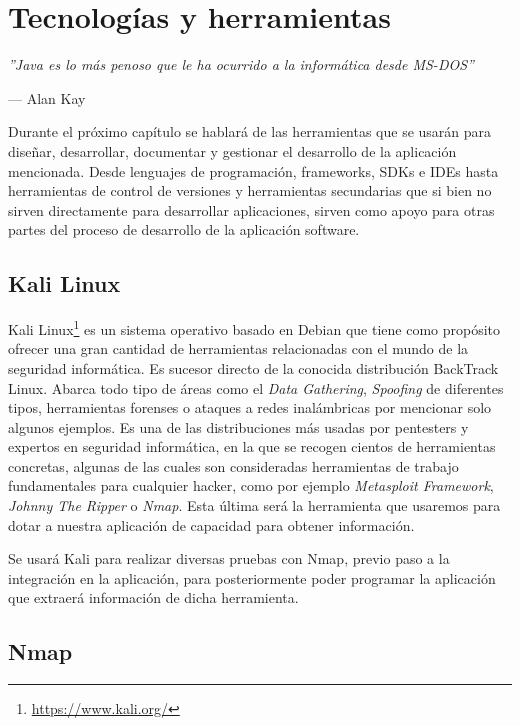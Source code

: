\chapter{Tecnologías y herramientas}

\epigraph{\textit{''Java es lo más penoso que le ha ocurrido a la informática desde MS-DOS''}}{--- Alan Kay}

Durante el próximo capítulo se hablará de las herramientas que se usarán para diseñar, desarrollar, documentar y gestionar el desarrollo de la aplicación mencionada. Desde lenguajes de programación, frameworks, SDKs e IDEs hasta herramientas de control de versiones y herramientas secundarias que si bien no sirven directamente para desarrollar aplicaciones, sirven como apoyo para otras partes del proceso de desarrollo de la aplicación software.

\section{Kali Linux}

Kali Linux\footnote{\url{https://www.kali.org/}} es un sistema operativo basado en Debian que tiene como propósito ofrecer una gran cantidad de herramientas relacionadas con el mundo de la seguridad informática. Es sucesor directo de la conocida distribución BackTrack Linux. Abarca todo tipo de áreas como el \textit{Data Gathering}, \textit{Spoofing} de diferentes tipos, herramientas forenses o ataques a redes inalámbricas por mencionar solo algunos ejemplos. Es una de las distribuciones más usadas por pentesters y expertos en seguridad informática, en la que se recogen cientos de herramientas concretas, algunas de las cuales son consideradas herramientas de trabajo fundamentales para cualquier hacker, como por ejemplo \textit{Metasploit Framework}, \textit{Johnny The Ripper} o \textit{Nmap}. Esta última será la herramienta que usaremos para dotar a nuestra aplicación de capacidad para obtener información.

Se usará Kali para realizar diversas pruebas con Nmap, previo paso a la integración en la aplicación, para posteriormente poder programar la aplicación que extraerá información de dicha herramienta.


\section{Nmap}

